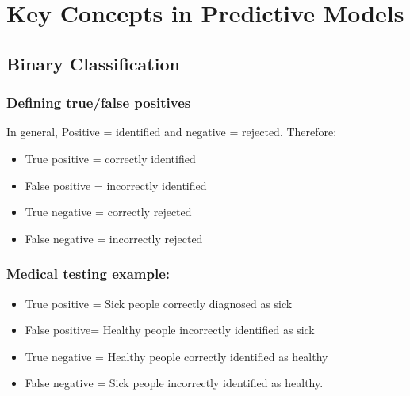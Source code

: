\documentclass[caret-main.tex]{subfiles}
\begin{document}
\section{Key Concepts in Predictive Models}
\subsection{Binary Classification}
\subsubsection*{Defining true/false positives}
In general, Positive = identified and negative = rejected. Therefore:

\begin{itemize}
\item True positive = correctly identified

\item False positive = incorrectly identified

\item True negative = correctly rejected

\item False negative = incorrectly rejected
\end{itemize}
\subsubsection*{Medical testing example:}
\begin{itemize}
\item True positive = Sick people correctly diagnosed as sick

\item False positive= Healthy people incorrectly identified as sick

\item True negative = Healthy people correctly identified as healthy

\item False negative = Sick people incorrectly identified as healthy.
\end{itemize}
\newpage
\end{document}
